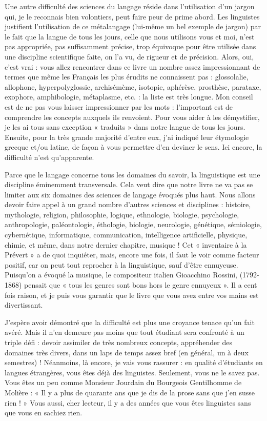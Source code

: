 Une autre difficulté des sciences du langage réside dans l’utilisation d’un jargon qui, je le reconnais bien volontiers, peut faire peur de prime abord. Les linguistes justifient l’utilisation de ce métalangage (lui-même un bel exemple de jargon) par le fait que la langue de tous les jours, celle que nous utilisons vous et moi, n’est pas appropriée, pas suffisamment précise, trop équivoque pour être utilisée dans une discipline scientifique faite, on l’a vu, de rigueur et de précision. Alors, oui, c’est vrai : vous allez rencontrer dans ce livre un nombre assez impressionnant de termes que même les Français les plus érudits ne connaissent pas : glossolalie, allophone, hyperpolyglossie, archisémème, isotopie, aphérèse, prosthèse, parataxe, exophore, amphibologie, métaplasme, etc. : la liste est très longue. Mon conseil est de ne pas vous laisser impressionner par les mots : l’important est de comprendre les concepts auxquels ils renvoient. Pour vous aider à les démystifier, je les ai tous sans exception « traduits » dans notre langue de tous les jours. Ensuite, pour la très grande majorité d’entre eux, j’ai indiqué leur étymologie grecque et/ou latine, de façon à vous permettre d’en deviner le sens. Ici encore, la difficulté n’est qu’apparente.

Parce que le langage concerne tous les domaines du savoir, la linguistique est une discipline éminemment transversale. Cela veut dire que notre livre ne va pas se limiter aux six domaines des sciences de langage évoqués plus haut. Nous allons devoir faire appel à un grand nombre d’autres sciences et disciplines : histoire, mythologie, religion, philosophie, logique, ethnologie, biologie, psychologie, anthropologie, paléontologie, éthologie, biologie, neurologie, génétique, sémiologie, cybernétique, informatique, communication, intelligence artificielle, physique, chimie, et même, dans notre dernier chapitre, musique ! Cet « inventaire à la Prévert » a de quoi inquiéter, mais, encore une fois, il faut le voir comme facteur positif, car on peut tout reprocher à la linguistique, sauf d’être ennuyeuse. Puisqu’on a évoqué la musique, le compositeur italien Gioacchino Rossini, (1792-1868) pensait que « tous les genres sont bons hors le genre ennuyeux ». Il a cent fois raison, et je puis vous garantir que le livre que vous avez entre vos mains est divertissant.

J’espère avoir démontré que la difficulté est plus une croyance tenace qu’un fait avéré. Mais il n’en demeure pas moins que tout étudiant sera confronté à un triple défi : devoir assimiler de très nombreux concepts, appréhender des domaines très divers, dans un laps de temps assez bref (en général, un à deux semestres) ! Néanmoins, là encore, je vais vous rassurer : en qualité d’étudiants en langues étrangères, vous êtes déjà des linguistes. Seulement, vous ne le savez pas. Vous êtes un peu comme Monsieur Jourdain du Bourgeois Gentilhomme de Molière : « Il y a plus de quarante ans que je dis de la prose sans que j’en susse rien ! » Vous aussi, cher lecteur, il y a des années que vous êtes linguistes sans que vous en sachiez rien.


